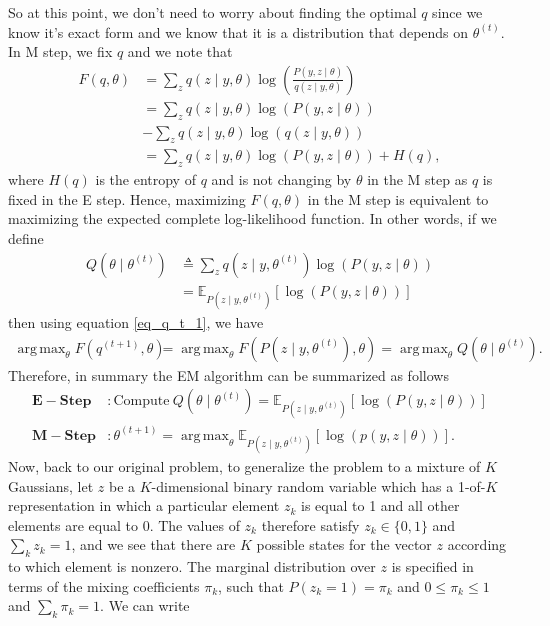 \documentclass[10pt ]{article}
\DeclareMathOperator*{\argmaxA}{arg\,max}
\begin{document}
So at this point, we don't need to worry about finding the optimal $q$ since we know it's exact form and we know that it is a distribution that depends on $\theta^{(t)}$. In M step, we fix $q$ and we note that
\begin{align}
F(q, \theta) &=  \sum_z q(z \mid y, \theta) \log \left( \frac{P(y,z \mid \theta)}{q(z \mid y, \theta)} \right) \nonumber \\
&= \sum_z q(z \mid y, \theta) \log \left( P(y,z \mid \theta)  \right) \nonumber \\
&- \sum_z q(z \mid y, \theta) \log \left(q(z \mid y, \theta) \right) \nonumber \\
&= \sum_z q(z \mid y, \theta) \log \left( P(y,z \mid \theta)  \right) + H(q),
\end{align}
where $H(q)$ is the entropy of $q$ and is not changing by $\theta$ in the M step as $q$ is fixed in the E step. Hence, maximizing $F(q, \theta)$ in the M step is equivalent to maximizing the expected complete log-likelihood function. In other words, if we define 
\begin{align}
Q(\theta \mid \theta^{(t)}) &\triangleq \sum_z q(z \mid y, \theta^{(t)}) \log \left( P(y,z \mid \theta)  \right) \nonumber \\
&=\mathbb{E}_{P(z \mid y, \theta^{(t)})} \left[ \log \left( P(y, z \mid \theta)\right)\right]
\end{align}
then using equation \eqref{eq_q_t_1}, we have 
\begin{align}
\argmaxA_{\theta}  F(q^{(t+1)}, \theta) &= \argmaxA_{\theta} F\left(P(z \mid y, \theta^{(t)}), \theta \right) = \argmaxA_{\theta} Q(\theta \mid \theta^{(t)}).
\end{align}
Therefore, in summary the EM algorithm can be summarized as follows
\begin{align}
\mathbf{E-Step} &: \mathrm{Compute}~ Q(\theta \mid \theta^{(t)}) =\mathbb{E}_{P(z \mid y, \theta^{(t)})} \left[ \log \left( P(y, z \mid \theta)\right)\right] \label{eq_e_step} \\
\mathbf{M-Step} &: \theta^{(t+1)} = \argmaxA_{\theta} \mathbb{E}_{P(z \mid y, \theta^{(t)})} \left[ \log \left( p (y, z \mid \theta) \right) \right].
\label{eq_m_step}
\end{align}
Now, back to our original problem, to generalize the problem to a mixture of $K$ Gaussians, let $z$ be a $K$-dimensional binary random variable which has a 1-of-$K$ representation in which a particular element $z_k$ is equal to 1 and all other elements are equal to 0. The values of $z_k$ therefore satisfy $z_k \in \{0, 1\}$ and $\sum_k z_k = 1$, and we see that there are $K$ possible states for the vector $z$ according to which element is nonzero. The marginal distribution over $z$ is specified in terms of the mixing coefficients $\pi_k$, such that $P(z_k = 1) = \pi_k$ and $0 \le \pi_k \le 1$ and $\sum_k \pi_k =1$. We can write
\end{document}
